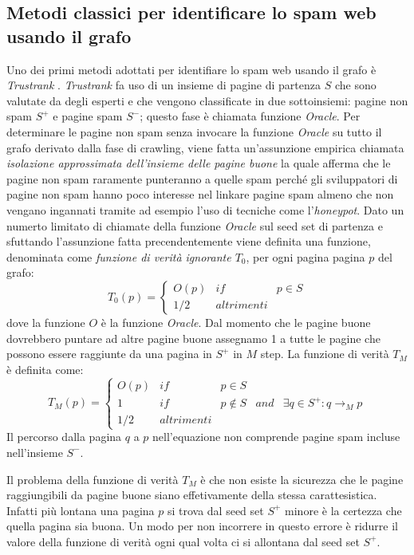 \subsection{Metodi classici per identificare lo spam web usando il grafo}
Uno dei primi metodi adottati per identifiare lo spam web usando il grafo è \textit{Trustrank} \cite{Gyongyi:2004:CWS:1316689.1316740}. \textit{Trustrank} fa uso di un insieme di pagine di partenza \(S\) che sono valutate da degli esperti e che vengono classificate in due sottoinsiemi: pagine non spam \(S^+\) e pagine spam \(S^-\); questo fase è chiamata funzione \textit{Oracle}. Per determinare le pagine non spam senza invocare la funzione \textit{Oracle} su tutto il grafo derivato dalla fase di crawling, viene fatta un'assunzione empirica chiamata \textit{isolazione approssimata dell'insieme delle pagine buone} la quale afferma che le pagine non spam raramente punteranno a quelle spam perché gli sviluppatori di pagine non spam hanno poco interesse nel linkare pagine spam almeno che non vengano ingannati tramite ad esempio l'uso di tecniche come l'\textit{honeypot}. Dato un numerto limitato di chiamate della funzione \textit{Oracle} sul seed set di partenza e sfuttando l'assunzione fatta precendentemente 
viene definita una funzione, denominata come \textit{funzione di verità ignorante \(T_0\)}, per ogni pagina pagina \(p\) del grafo:
\begin{equation}
T_0(p)=\left\{
\begin{array}{ccc}
O(p) & if & p\in S \\
1/2 & altrimenti
\end{array}
\right .
\end{equation}
dove la funzione \(O\) è la funzione \textit{Oracle}. Dal momento che le pagine buone dovrebbero puntare ad altre pagine buone assegnamo 1 a tutte le pagine che possono essere raggiunte da una pagina in \(S^+\) in \(M\) step. La funzione di verità \(T_M\) è definita come:
\begin{equation}
T_M(p)=\left\{
\begin{array}{ccccc}
O(p) & if & p\in S \\
1 & if & p \not\in S & and & \exists q\in S^+:q\rightarrow_M p \\
1/2 & altrimenti
\end{array}
\right .
\end{equation}
Il percorso  dalla pagina \(q\) a \(p\) nell'equazione non comprende pagine spam incluse nell'insieme \(S^-\).

Il problema della funzione di verità \(T_M\) è che non esiste la sicurezza che le pagine raggiungibili da pagine buone siano effetivamente della stessa carattesistica. Infatti più lontana una pagina \(p\) si trova dal seed set \(S^+\) minore è la certezza che quella pagina sia buona. Un modo per non incorrere in questo errore è ridurre il valore della funzione di verità ogni qual volta ci si allontana dal seed set \(S^+\).

